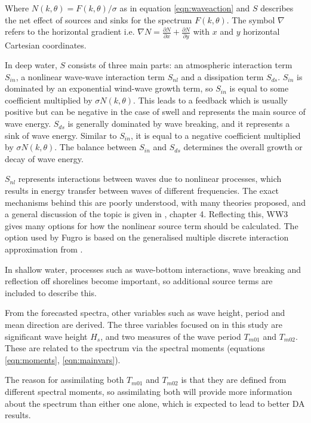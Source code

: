 Where $N(k,\theta) = F(k,\theta)/\sigma$ as in equation \ref{eqn:waveaction} and $S$ describes the net effect of sources and sinks for the spectrum $F(k,\theta)$. The symbol $\nabla$ refers to the horizontal gradient i.e. $\nabla N = \frac{\partial N}{\partial x} + \frac{\partial N}{\partial y}$ with $x$ and $y$ horizontal Cartesian coordinates.

In deep water, $S$ consists of three main parts: an atmospheric interaction term $S_{in}$, a nonlinear wave-wave interaction term $S_{nl}$ and a dissipation term $S_{ds}$. $S_{in}$ is dominated by an exponential wind-wave growth term, so $S_{in}$ is equal to some coefficient multiplied by $\sigma N(k,\theta)$. This leads to a feedback which is usually positive but can be negative in the case of swell and represents the main source of wave energy.
$S_{ds}$ is generally dominated by wave breaking, and it represents a sink of wave energy. Similar to $S_{in}$, it is equal to a negative coefficient multiplied by $\sigma N(k,\theta)$. The balance between $S_{in}$ and $S_{ds}$ determines the overall growth or decay of wave energy.

$S_{nl}$ represents interactions between waves due to nonlinear processes, which results in energy transfer between waves of different frequencies. The exact mechanisms behind this are poorly understood, with many theories proposed, and a general discussion of the topic is given in \citet{Janssen2004}, chapter 4. Reflecting this, WW3 gives many options for how the nonlinear source term should be calculated. The option used by Fugro is based on the generalised multiple discrete interaction approximation from \citet{Tolman2013}.

In shallow water, processes such as wave-bottom interactions, wave breaking and reflection off shorelines become important, so additional source terms are included to describe this.

From the forecasted spectra, other variables such as wave height, period and mean direction are derived. The three variables focused on in this study are significant wave height $H_s$, and two measures of the wave period $T_{m01}$ and $T_{m02}$. These are related to the spectrum via the spectral moments (equations \ref{eqn:moments}, \ref{eqn:mainvars}).

The reason for assimilating both $T_{m01}$ and $T_{m02}$ is that they are defined from different spectral moments, so assimilating both will provide more information about the spectrum than either one alone, which is expected to lead to better DA results.

